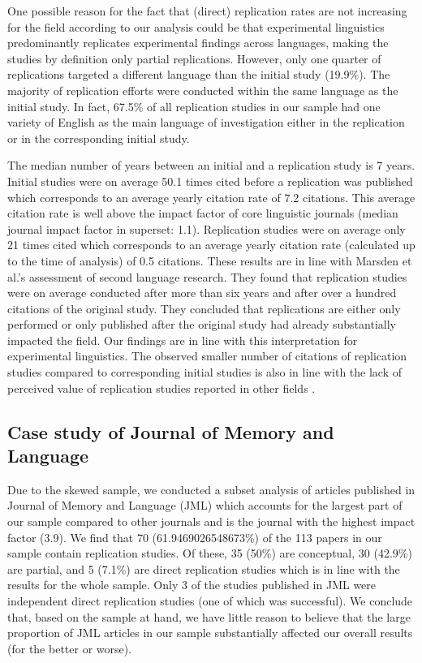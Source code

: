 \documentclass[cm,linguex]{glossa}
\begin{document}
One possible reason for the fact that (direct) replication rates are not increasing for the field according to our analysis could be that experimental linguistics predominantly replicates experimental findings across languages, making the studies by definition only partial replications.
However, only one quarter of replications targeted a different language than the initial study (19.9\%).
The majority of replication efforts were conducted within the same language as the initial study.
In fact, 67.5\% of all replication studies in our sample had one variety of English as the main language of investigation either in the replication or in the corresponding initial study.

The median number of years between an initial and a replication study is 7 years.
Initial studies were on average 50.1 times cited before a replication was published which corresponds to an average yearly citation rate of 7.2 citations.
This average citation rate is well above the impact factor of core linguistic journals (median journal impact factor in superset: 1.1).
Replication studies were on average only 21 times cited which corresponds to an average yearly citation rate (calculated up to the time of analysis) of 0.5 citations. These results are in line with Marsden et al.'s \citeyearpar{marsden_replication_2018} assessment of second language research. They found that replication studies were on average conducted after more than six years and after over a hundred citations of the original study. They concluded that replications are either only performed or only published after the original study had already substantially impacted the field. Our findings are in line with this interpretation for experimental linguistics.
The observed smaller number of citations of replication studies compared to corresponding initial studies is also in line with the lack of perceived value of replication studies reported in other fields \citep[e.g.,][]{koole_rewarding_2012, nosek_scientific_2012}.

\hypertarget{case-study-of-journal-of-memory-and-language}{%
\subsection{Case study of Journal of Memory and Language}\label{case-study-of-journal-of-memory-and-language}}

Due to the skewed sample, we conducted a subset analysis of articles published in Journal of Memory and Language (JML) which accounts for the largest part of our sample compared to other journals and is the journal with the highest impact factor (3.9). We find that 70 (61.9469026548673\%) of the 113 papers in our sample contain replication studies. Of these, 35 (50\%) are conceptual, 30 (42.9\%) are partial, and 5 (7.1\%) are direct replication studies which is in line with the results for the whole sample. Only 3 of the studies published in JML were independent direct replication studies (one of which was successful). We conclude that, based on the sample at hand, we have little reason to believe that the large proportion of JML articles in our sample substantially affected our overall results (for the better or worse).
\end{document}
